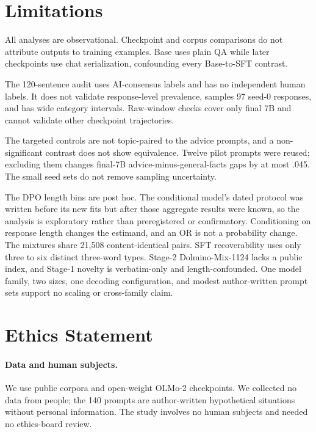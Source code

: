 \documentclass[11pt]{article}
\begin{document}
\section{Limitations}
\label{sec:limitations}

All analyses are observational. Checkpoint and corpus comparisons do not
attribute outputs to training examples. Base uses plain QA while later
checkpoints use chat serialization, confounding every Base-to-SFT contrast.

The 120-sentence audit uses AI-consensus labels and has no independent human
labels. It does not validate response-level prevalence, samples 97 seed-0
responses, and has wide category intervals. Raw-window checks cover only final
7B and cannot validate other checkpoint trajectories.

The targeted controls are not topic-paired to the advice prompts, and a
non-significant contrast does not show equivalence. Twelve pilot prompts were
reused; excluding them changes final-7B advice-minus-general-facts gaps by at
most .045. The small seed sets do not remove sampling uncertainty.

The DPO length bins are post hoc. The conditional model's dated protocol was
written before its new fits but after those aggregate results were known, so the
analysis is exploratory rather than preregistered or confirmatory. Conditioning
on response length changes the estimand, and an OR is not a probability change.
The mixtures share 21{,}508 content-identical pairs. SFT recoverability uses
only three to six distinct three-word types. Stage-2 Dolmino-Mix-1124 lacks a
public index, and Stage-1 novelty is verbatim-only and length-confounded. One
model family, two sizes, one decoding configuration, and modest author-written
prompt sets support no scaling or cross-family claim.

\section*{Ethics Statement}

\paragraph{Data and human subjects.} We use public corpora and open-weight
OLMo-2 checkpoints. We collected no data from people; the 140 prompts are
author-written hypothetical situations without personal information. The study
involves no human subjects and needed no ethics-board review.
\end{document}
